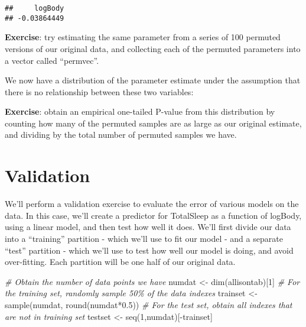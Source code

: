 \documentclass[
]{book}
\newenvironment{Shaded}{\begin{snugshade}}{\end{snugshade}}
\newcommand{\AttributeTok}[1]{\textcolor[rgb]{0.77,0.63,0.00}{#1}}
\newcommand{\CommentTok}[1]{\textcolor[rgb]{0.56,0.35,0.01}{\textit{#1}}}
\newcommand{\DecValTok}[1]{\textcolor[rgb]{0.00,0.00,0.81}{#1}}
\newcommand{\FloatTok}[1]{\textcolor[rgb]{0.00,0.00,0.81}{#1}}
\newcommand{\FunctionTok}[1]{\textcolor[rgb]{0.00,0.00,0.00}{#1}}
\newcommand{\NormalTok}[1]{#1}
\newcommand{\OtherTok}[1]{\textcolor[rgb]{0.56,0.35,0.01}{#1}}
\newcommand{\SpecialCharTok}[1]{\textcolor[rgb]{0.00,0.00,0.00}{#1}}
\begin{document}
\begin{Shaded}
\end{Shaded}

\begin{verbatim}
##     logBody 
## -0.03864449
\end{verbatim}

\textbf{Exercise}: try estimating the same parameter from a series of 100 permuted versions of our original data, and collecting each of the permuted parameters into a vector called ``permvec''.

We now have a distribution of the parameter estimate under the assumption that there is no relationship between these two variables:

\textbf{Exercise}: obtain an empirical one-tailed P-value from this distribution by counting how many of the permuted samples are as large as our original estimate, and dividing by the total number of permuted samples we have.

\hypertarget{validation}{%
\section{Validation}\label{validation}}

We'll perform a validation exercise to evaluate the error of various models on the data. In this case, we'll create a predictor for TotalSleep as a function of logBody, using a linear model, and then test how well it does. We'll first divide our data into a ``training'' partition - which we'll use to fit our model - and a separate ``test'' partition - which we'll use to test how well our model is doing, and avoid over-fitting. Each partition will be one half of our original data.

\begin{Shaded}
\begin{Highlighting}[]
\CommentTok{\# Obtain the number of data points we have}
\NormalTok{numdat }\OtherTok{\textless{}{-}} \FunctionTok{dim}\NormalTok{(allisontab)[}\DecValTok{1}\NormalTok{]}
\CommentTok{\# For the training set, randomly sample 50\% of the data indexes}
\NormalTok{trainset }\OtherTok{\textless{}{-}} \FunctionTok{sample}\NormalTok{(numdat, }\FunctionTok{round}\NormalTok{(numdat}\SpecialCharTok{*}\FloatTok{0.5}\NormalTok{))}
\CommentTok{\# For the test set, obtain all indexes that are not in training set}
\NormalTok{testset }\OtherTok{\textless{}{-}} \FunctionTok{seq}\NormalTok{(}\DecValTok{1}\NormalTok{,numdat)[}\SpecialCharTok{{-}}\NormalTok{trainset]}
\end{Highlighting}
\end{Shaded}
\end{document}
